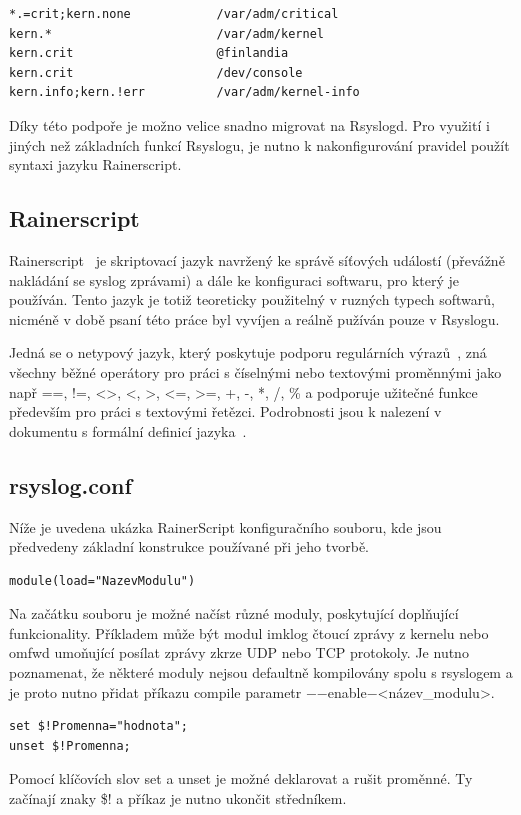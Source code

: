 \documentclass[thesis=B,czech]{FITthesis}[2012/06/26]
\begin{document}
\begin{lstlisting}
*.=crit;kern.none            /var/adm/critical
kern.*                       /var/adm/kernel
kern.crit                    @finlandia
kern.crit                    /dev/console
kern.info;kern.!err          /var/adm/kernel-info
\end{lstlisting}

Díky této podpoře je možno velice snadno migrovat na Rsyslogd.
Pro využití i jiných než základních funkcí Rsyslogu, je nutno k nakonfigurování pravidel použít syntaxi jazyku Rainerscript.

\subsection{Rainerscript}
Rainerscript~\cite{RainerScript} je skriptovací jazyk navržený ke správě síťových událostí (převážně nakládání se syslog zprávami) a dále ke konfiguraci softwaru, pro který je používán.
Tento jazyk je totiž teoreticky použitelný v ruzných typech softwarů, nicméně v době psaní této práce byl vyvíjen a reálně pužíván pouze v Rsyslogu.

Jedná se o netypový jazyk, který poskytuje podporu regulárních výrazů~\cite{RainerScriptPropertyReplacer}, zná všechny běžné operátory pro práci s číselnými nebo textovými proměnnými jako např ==, !=, <>, <, >, <=, >=, +, -, *, /, \% a podporuje užitečné funkce především pro práci s textovými řetězci.
Podrobnosti jsou k nalezení v dokumentu s formální definicí jazyka~\cite{RainerScriptFormalDefinition}.

\subsection{rsyslog.conf}
Níže je uvedena ukázka RainerScript konfiguračního souboru, kde jsou předvedeny základní konstrukce používané při jeho tvorbě.

\begin{lstlisting}
module(load="NazevModulu")
\end{lstlisting}
Na začátku souboru je možné načíst různé moduly, poskytující doplňující funkcionality. Příkladem může být modul imklog čtoucí zprávy z kernelu nebo omfwd umoňující posílat zprávy zkrze UDP nebo TCP protokoly. Je nutno poznamenat, že některé moduly nejsou defaultně kompilovány spolu s rsyslogem a je proto nutno přidat příkazu compile parametr $-$$-$enable$-$<název\_modulu>.

\begin{lstlisting}
set $!Promenna="hodnota";
unset $!Promenna;
\end{lstlisting}
Pomocí klíčovích slov set a unset je možné deklarovat a rušit proměnné. Ty začínají znaky \$! a příkaz je nutno ukončit středníkem.
\end{document}
